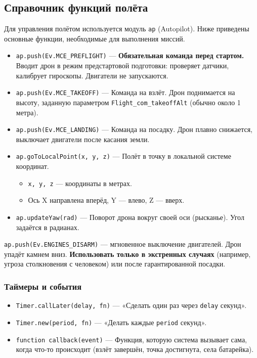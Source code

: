 \subsection{Справочник функций полёта}

Для управления полётом используется модуль \texttt{ap} (Autopilot). Ниже приведены основные функции, необходимые для выполнения миссий.

\begin{infobox}
\begin{itemize}
   \item \texttt{ap.push(Ev.MCE\_PREFLIGHT)} — \textbf{Обязательная команда перед стартом.} Вводит дрон в режим предстартовой подготовки: проверяет датчики, калибрует гироскопы. Двигатели не запускаются.
   
   \item \texttt{ap.push(Ev.MCE\_TAKEOFF)} — Команда на взлёт. Дрон поднимается на высоту, заданную параметром \texttt{Flight\_com\_takeoffAlt} (обычно около 1 метра).
   
   \item \texttt{ap.push(Ev.MCE\_LANDING)} — Команда на посадку. Дрон плавно снижается, выключает двигатели после касания земли.
   
   \item \texttt{ap.goToLocalPoint(x, y, z)} — Полёт в точку в локальной системе координат.
   \begin{itemize}
       \item \texttt{x, y, z} — координаты в метрах.
       \item Ось X направлена вперёд, Y — влево, Z — вверх.
   \end{itemize}
   
   \item \texttt{ap.updateYaw(rad)} — Поворот дрона вокруг своей оси (рысканье). Угол задаётся в радианах.
\end{itemize}
\end{infobox}

\begin{warnbox}
\texttt{ap.push(Ev.ENGINES\_DISARM)} — мгновенное выключение двигателей. Дрон упадёт камнем вниз.
\textbf{Использовать только в экстренных случаях} (например, угроза столкновения с человеком) или после гарантированной посадки.
\end{warnbox}

\subsubsection{Таймеры и события}
\begin{itemize}
   \item \texttt{Timer.callLater(delay, fn)} — «Сделать один раз через \texttt{delay} секунд».
   \item \texttt{Timer.new(period, fn)} — «Делать каждые \texttt{period} секунд».
   \item \texttt{function callback(event)} — Функция, которую система вызывает сама, когда что-то происходит (взлёт завершён, точка достигнута, села батарейка).
\end{itemize}

